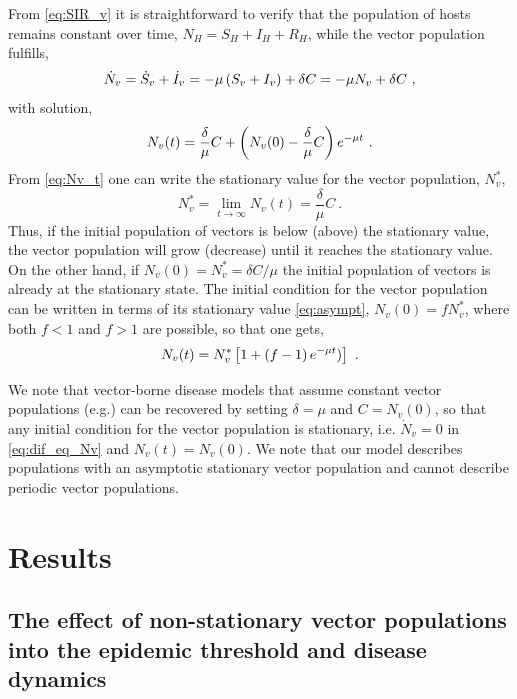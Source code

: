From \cref{eq:SIR_v} it is straightforward to verify that the population of
hosts remains constant over time, $N_H=S_H+I_H+R_H$, while the vector
population fulfills,
\begin{equation}\label{eq:dif_eq_Nv}
    \dot{N}_v=\dot{S}_v+\dot{I}_v=-\mu\left(S_v+I_v\right)+\delta C=-\mu N_v
    + \delta C \ ,
\end{equation}
with solution,
\begin{equation}\label{eq:Nv_t}
    N_v(t)=\frac{\delta}{\mu}C +
    \left(N_v(0)-\frac{\delta}{\mu}C\right)e^{-\mu t} \ .
\end{equation}
From \cref{eq:Nv_t} one can write the stationary value for the vector
population, $N_v^*$,
\begin{equation}
    N_v^*=\lim_{t\to\infty}N_v(t)=\frac{\delta}{\mu}C \ .
    \label{eq:asympt}
\end{equation}
Thus, if the initial population of vectors is below (above) the stationary
value, the vector population will grow (decrease) until it reaches the
stationary value. On the other hand, if $N_v(0)=N_v^*=\delta C/\mu$ the initial
population of vectors is already at the stationary state. The initial condition
for the vector population can be written in terms of its stationary value
\cref{eq:asympt}, $N_v(0)=fN_v^*$, where both $f<1$ and $f>1$ are possible, so
that one gets,
\begin{equation}\label{eq:Nv_t_fraction}
    N_v(t)=N_v^*\claudator{1+\parentesi{f-1}e^{-\mu t})} \ .
\end{equation}

We note that vector-borne disease models that assume constant vector
populations (e.g.\cite{Brauer2016}) can be recovered by setting $\delta=\mu$
and $C=N_v(0)$, so that any initial condition for the vector population is
stationary, i.e. $\dot{N}_v=0$ in \cref{eq:dif_eq_Nv} and $N_v(t)=N_v(0)$. We
note that our model describes populations with an asymptotic stationary vector
population and cannot describe periodic vector populations.

\section{Results} \label{sec:results}

\subsection{The effect of non-stationary vector populations into the epidemic
    threshold and disease dynamics}
\label{sec:R0statvp}

